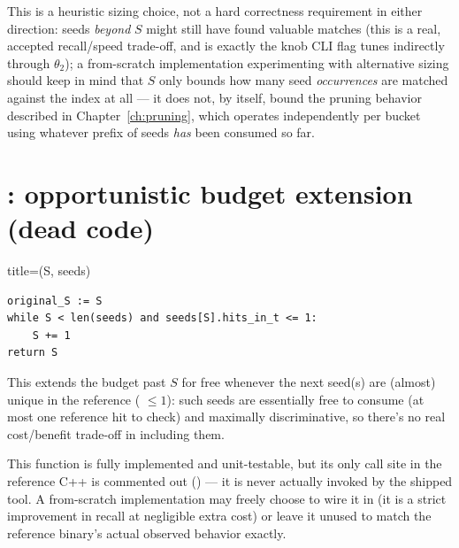 \begin{notebox}
This is a heuristic sizing choice, not a hard correctness requirement in either direction: seeds
\emph{beyond} $S$ might still have found valuable matches (this is a real, accepted
recall/speed trade-off, and is exactly the knob CLI flag  tunes indirectly through
$\theta_2$); a from-scratch implementation experimenting with alternative sizing should keep in
mind that $S$ only bounds how many seed \emph{occurrences} are matched against the index at all
--- it does not, by itself, bound the pruning behavior described in Chapter~\ref{ch:pruning},
which operates independently per bucket using whatever prefix of seeds \emph{has} been consumed
so far.
\end{notebox}

\section{: opportunistic budget extension (dead code)}

\begin{algobox}{title={(S, seeds)}}
\begin{verbatim}
original_S := S
while S < len(seeds) and seeds[S].hits_in_t <= 1:
    S += 1
return S
\end{verbatim}
\end{algobox}

This extends the budget past $S$ for free whenever the next seed(s) are (almost) unique in the
reference ( $\le 1$): such seeds are essentially free to consume (at most one
reference hit to check) and maximally discriminative, so there's no real cost/benefit trade-off in
including them.

\begin{bugbox}
This function is fully implemented and unit-testable, but its only call site in the reference C++
 is commented out () --- it is
never actually invoked by the shipped tool. A from-scratch implementation may freely choose to
wire it in (it is a strict improvement in recall at negligible extra cost) or leave it unused to
match the reference binary's actual observed behavior exactly.
\end{bugbox}
